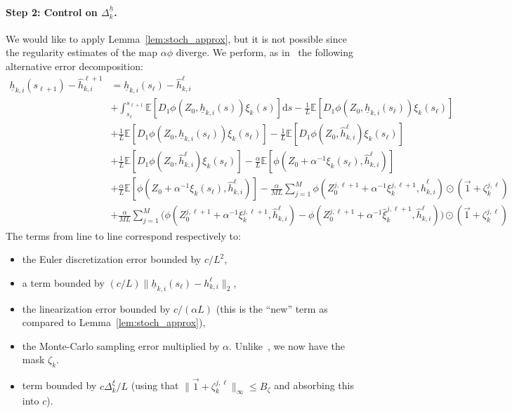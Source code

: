 \documentclass[a4paper,11pt]{article}
\newcommand{\1}{\mathbbm{1}}
\theoremstyle{definition}
\theoremstyle{remark}
\begin{document}
\paragraph{Step 2: Control on $\Delta_k^{\underline{h}}$.} We would like to apply Lemma~\ref{lem:stoch_approx}, but it is not possible since the regularity estimates of the map $\alpha\phi$ diverge. We perform, as in~\cite{chizat2025hidden} the following alternative error decomposition:
    \[
        \begin{aligned}
            \underline{h}_{k,i}(s_{\ell+1}) - \hat{h}_{k,i}^{\ell+1} &= \underline{h}_{k,i}(s_\ell) - \hat{h}_{k,i}^\ell \\
            &+ \int_{s_\ell}^{s_{\ell+1}} \mathbb{E}[D_1\phi(Z_0,\underline{h}_{k,i}(s))\xi_k(s)] \mathrm{d}s - \frac{1}{L} \mathbb{E}[D_1\phi(Z_0,\underline{h}_{k,i}(s_\ell))\xi_k(s_\ell)] \\
            &+ \frac{1}{L} \mathbb{E}[D_1\phi(Z_0, \underline{h}_{k,i}(s_\ell))\xi_k(s_\ell)] - \frac{1}{L} \mathbb{E}[D_1\phi(Z_0,\hat{h}_{k,i}^\ell)\xi_k(s_\ell)] \\
            &+ \frac{1}{L} \mathbb{E}[D_1\phi(Z_0,\hat{h}_{k,i}^\ell)\xi_k(s_\ell)] - \frac{\alpha}{L} \mathbb{E}[\phi(Z_0 + \alpha^{-1}\xi_k(s_\ell), \hat{h}_{k,i}^\ell)] \\
            &+ \frac{\alpha}{L} \mathbb{E}[\phi(Z_0 + \alpha^{-1}\xi_k(s_\ell), \hat{h}_{k,i}^\ell)] - \frac{\alpha}{ML} \sum_{j=1}^M \phi(Z_0^{j,\ell+1} + \alpha^{-1}\xi_k^{j,\ell+1}, \hat{h}_{k,i}^\ell){\odot}(\vec{1}+\zeta_k^{j,\ell}) \\
            &+ \frac{\alpha}{ML} \sum_{j=1}^M  \Big(\phi(Z_0^{j,\ell+1} + \alpha^{-1}\xi_k^{j,\ell+1}, \hat{h}_{k,i}^\ell) - \phi(Z_0^{j,\ell+1} + \alpha^{-1}\hat{\xi}_k^{j,\ell+1}, \hat{h}_{k,i}^\ell)\Big){\odot}(\vec{1}+\zeta_k^{j,\ell})
        \end{aligned}
    \]
    The terms from line to line correspond respectively to:
    \begin{itemize}
        \item the Euler discretization error bounded by $c/L^2$,
        \item a term bounded by $(c/L)\|\underline{h}_{k,i}(s_\ell) - h_{k,i}^\ell\|_2$,
        \item the linearization error bounded by $c/(\alpha L)$ (this is the ``new'' term as compared to Lemma~\ref{lem:stoch_approx}),
        \item the Monte-Carlo sampling error multiplied by $\alpha$. Unlike~\cite{chizat2025hidden}, we now have the mask $\zeta_k$.
        \item  term bounded by $c\Delta_k^\xi / L$ (using that $\|\vec{1}+\zeta_k^{j,\ell}\|_{\infty} \leq B_\zeta$ and absorbing this into $c$).
    \end{itemize}
\end{document}
